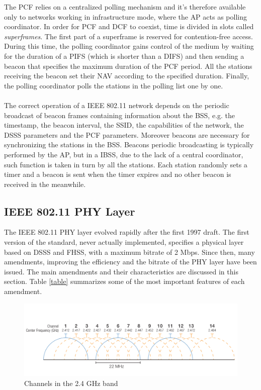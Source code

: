 The \gls{PCF} relies on a centralized polling mechanism and it's therefore available only to networks working in infrastructure mode, where the \gls{AP} acts as polling coordinator. In order for \gls{PCF} and \gls{DCF} to coexist, time is divided in slots called \textit{superframes}. The first part of a superframe is reserved for contention-free access. During this time, the polling coordinator gains control of the medium by waiting for the duration of a \gls{PIFS} (which is shorter than a \gls{DIFS}) and then sending a beacon that specifies the maximum duration of the \gls{PCF} period. All the stations receiving the beacon set their \gls{NAV} according to the specified duration. Finally, the polling coordinator polls the stations in the polling list one by one. \\ \\
The correct operation of a IEEE 802.11 network depends on the periodic broadcast of beacon frames containing information about the \gls{BSS}, e.g. the timestamp, the beacon interval, the \gls{SSID}, the capabilities of the network, the \gls{DSSS} parameters and the \gls{PCF} parameters. Moreover beacons are necessary for synchronizing the stations in the \gls{BSS}. Beacons periodic broadcasting is typically performed by the \gls{AP}, but in a \gls{IBSS}, due to the lack of a central coordinator, such function is taken in turn by all the stations. Each station randomly sets a timer and a beacon is sent when the timer expires and no other beacon is received in the meanwhile.


\subsection{IEEE 802.11 PHY Layer}

The IEEE 802.11 PHY layer evolved rapidly after the first 1997 draft. The first version of the standard, never actually implemented, specifies a physical layer based on \gls{DSSS} and \gls{FHSS}, with a maximum bitrate of 2 Mbps. Since then, many amendments, improving the efficiency and the bitrate of the PHY layer have been issued. The main amendments and their characteristics are discussed in this section. Table \ref{table} summarizes some of the most important features of each amendment.

\begin{figure}[h]
    \centering
    \includegraphics[width=1\textwidth]{images/wifi-channels-24.png}
    \caption{Channels in the 2.4 GHz band \cite{appinwififolder}}
    \label{fig:wifi-channels-24}
\end{figure}


